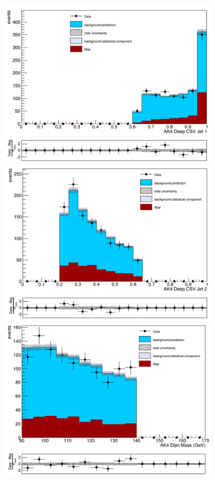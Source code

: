 \begin{figure}[thb!]
\begin{center}
\includegraphics[scale=0.25]{Figures/AK41dcsvCR2.pdf}
\includegraphics[scale=0.25]{Figures/AK42dcsvCR2.pdf}\\
\includegraphics[scale=0.25]{Figures/AK4djmCR2.pdf}

\end{center}
\end{figure}

